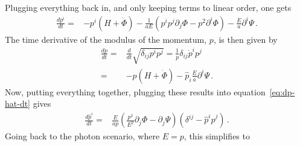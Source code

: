 Plugging everything back in, and only keeping terms to linear order, one gets
\begin{equation}
	\begin{split}
		\frac{dp^i}{dt} %
		=& -p^i(H+\dot\Phi)- \frac{1}{aE}\left(p^ip^j\partial_j\Phi - p^2\partial^i\Phi\right) -\frac{E}{a}\partial^i\Psi\,.
	\end{split}
\end{equation}
The time derivative of the modulus of the momentum, $p$, is then given by
\begin{equation}
	\begin{split}
		\frac{dp}{dt} =& \frac{d}{dt}\sqrt{\delta_{ij}p^ip^j} = \frac{1}{p}\delta_{ij}\dot p^i p^j \\
		=& -p(H+\dot\Phi) - \hat{p}_i\frac{E}{a}\partial^i\Psi\,.
	\end{split}
\end{equation}
Now, putting everything together, plugging these results into equation~\ref{eq:dp-hat-dt} gives
\begin{equation}
	\begin{split}
		\frac{d\hat{p}^i}{dt} %
		=&  \frac{E}{ap}\left( \frac{p^2}{E^2}\partial_j\Phi - \partial_j\Psi \right)(\delta^{ij}-\hat{p}^i\hat{p}^j)\,.
	\end{split}
\end{equation} 
Going back to the photon scenario, where $E=p$, this simplifies to
